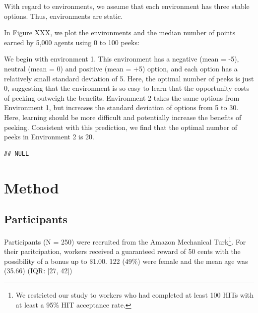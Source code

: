 \documentclass[a4paper,doc,natbib,floatsintext]{apa6}
\begin{document}
With regard to environments, we assume that each environment has three stable options. Thus, environments are static.

In Figure XXX, we plot the environments and the median number of points earned by 5,000 agents using 0 to 100 peeks:





We begin with environment 1. This environment has a negative (mean = -5), neutral (mean = 0) and positive (mean = +5) option, and each option has a relatively small standard deviation of 5. Here, the optimal number of peeks is just 0, suggesting that the environment is so easy to learn that the opportunity costs of peeking outweigh the benefits. Environment 2 takes the same options from Environment 1, but increases the standard deviation of options from 5 to 30. Here, learning should be more difficult and potentially increase the benefits of peeking. Consistent with this prediction, we find that the optimal number of peeks in Environment 2 is 20.







\begin{knitrout}
\color{fgcolor}\begin{kframe}
\begin{verbatim}
## NULL
\end{verbatim}
\end{kframe}
\end{knitrout}








\section{Method}

\subsection{Participants}

Participants (N = 250) were recruited from the Amazon Mechanical Turk\footnote{We restricted our study to workers who had completed at least 100 HITs with at least a 95\% HIT acceptance rate.}. For their paritcipation, workers received a guaranteed reward of 50 cents with the possibility of a bonus up to \$1.00. 122 (49\%) were female and the mean age was (35.66) (IQR: [27, 42])
\end{document}
